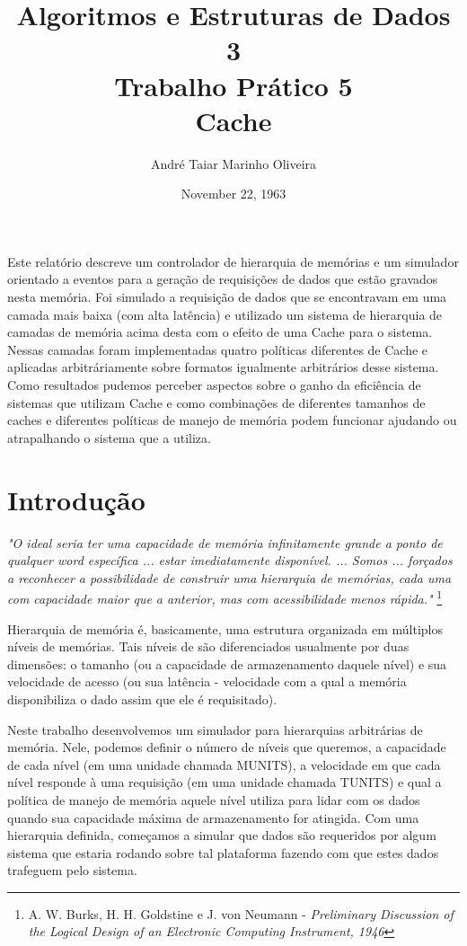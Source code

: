 \documentclass[12pt]{article}
\title{Algoritmos e Estruturas de Dados 3 \\ Trabalho Prático 5 \\
\huge{Cache}}
\date{November 22, 1963}
\author{André Taiar Marinho Oliveira}
\begin{document}
\maketitle

\begin{resumo}
\label{resumo}
Este relatório descreve um controlador de hierarquia de memórias e um simulador orientado a eventos para a geração de requisições de dados que estão gravados nesta memória. Foi simulado a requisição de dados que se encontravam em uma camada mais baixa (com alta latência) e utilizado um sistema de hierarquia de camadas de memória acima desta com o efeito de uma Cache para o sistema. Nessas camadas foram implementadas quatro políticas diferentes de Cache e aplicadas arbitráriamente sobre formatos igualmente arbitrários desse sistema. Como resultados pudemos perceber aspectos sobre o ganho da eficiência de sistemas que utilizam Cache e como combinações de diferentes tamanhos de caches e diferentes políticas de manejo de memória podem funcionar ajudando ou atrapalhando o sistema que a utiliza.
\end{resumo}

\section{Introdução}
\label{introducao}
\textit{"O ideal seria ter uma capacidade de memória infinitamente grande a ponto de qualquer word específica ... estar imediatamente disponível. ... Somos ... forçados a reconhecer a possibilidade de construir uma hierarquia de memórias, cada uma com capacidade maior que a anterior, mas com acessibilidade menos rápida."} \footnote{A. W. Burks, H. H. Goldstine e J. von Neumann - \textit{Preliminary Discussion of the Logical Design of an Electronic Computing Instrument, 1946}}

Hierarquia de memória é, basicamente, uma estrutura organizada em múltiplos níveis de memórias. Tais níveis de são diferenciados usualmente por duas dimensões: o tamanho (ou a capacidade de armazenamento daquele nível) e sua velocidade de acesso (ou sua latência - velocidade com a qual a memória disponibiliza o dado assim que ele é requisitado).

Neste trabalho desenvolvemos um simulador para hierarquias arbitrárias de memória. Nele, podemos definir o número de níveis que queremos, a capacidade de cada nível (em uma unidade chamada MUNITS), a velocidade em que cada nível responde à uma requisição (em uma unidade chamada TUNITS) e qual a política de manejo de memória aquele nível utiliza para lidar com os dados quando sua capacidade máxima de armazenamento for atingida. Com uma hierarquia definida, começamos a simular que dados são requeridos por algum sistema que estaria rodando sobre tal plataforma fazendo com que estes dados trafeguem pelo sistema.
\end{document}

